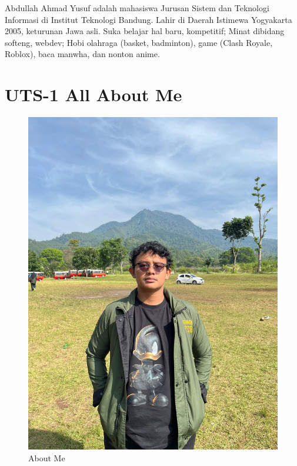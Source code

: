 \documentclass[
  letterpaper,
  DIV=11,
  numbers=noendperiod]{scrreprt}
\begin{document}
Abdullah Ahmad Yusuf adalah mahasiswa Jurusan Sistem dan Teknologi
Informasi di Institut Teknologi Bandung. Lahir di Daerah Istimewa
Yogyakarta 2005, keturunan Jawa asli. Suka belajar hal baru, kompetitif;
Minat dibidang softeng, webdev; Hobi olahraga (basket, badminton), game
(Clash Royale, Roblox), baca manwha, dan nonton anime.


\chapter{UTS-1 All About Me}\label{uts-1-all-about-me}

\begin{figure}[H]

{\centering \includegraphics[width=9.5\linewidth,height=\textheight,keepaspectratio]{All_About_me/../images/ayus.jpg}

}

\caption{About Me}

\end{figure}%
\end{document}
